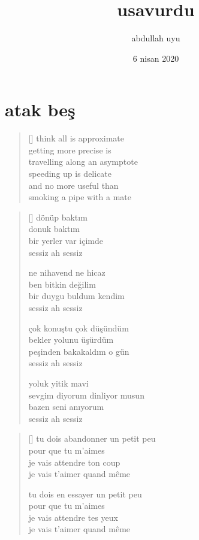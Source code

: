 \documentclass[a5paper, openright, twoside]{memoir}
\title{usavurdu}
\date{6 nisan 2020}
\author{abdullah uyu}
\begin{document}
\maketitle
\tableofcontents
\chapter{atak beş}
\begin{verse}[\versewidth]
  think all is approximate \\
  getting more precise is \\
  travelling along an asymptote \\
  speeding up is delicate \\
  and no more useful than \\
  smoking a pipe with a mate \\
\end{verse}
\begin{verse}[\versewidth]
  dönüp baktım \\
  donuk baktım \\
  bir yerler var içimde \\
  sessiz ah sessiz

  ne nihavend ne hicaz \\
  ben bitkin değilim \\
  bir duygu buldum kendim \\
  sessiz ah sessiz

  çok konuştu çok düşündüm \\
  bekler yolunu üşürdüm \\
  peşinden bakakaldım o gün \\
  sessiz ah sessiz

  yoluk yitik mavi \\
  sevgim diyorum dinliyor musun \\
  bazen seni anıyorum \\
  sessiz ah sessiz
\end{verse}
\begin{verse}[\versewidth]
  tu dois abandonner un petit peu \\
  pour que tu m'aimes \\
  je vais attendre ton coup \\
  je vais t'aimer quand même

  tu dois en essayer un petit peu \\
  pour que tu m'aimes \\
  je vais attendre tes yeux \\
  je vais t'aimer quand même
\end{verse}
\end{document}
